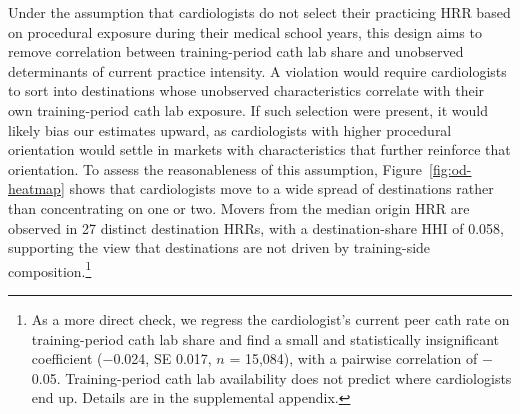 \documentclass[12pt]{article}
\begin{document}
Under the assumption that cardiologists do not select their practicing HRR based on procedural exposure during their medical school years, this design aims to remove correlation between training-period cath lab share and unobserved determinants of current practice intensity. A violation would require cardiologists to sort into destinations whose unobserved characteristics correlate with their own training-period cath lab exposure. If such selection were present, it would likely bias our estimates upward, as cardiologists with higher procedural orientation would settle in markets with characteristics that further reinforce that orientation. To assess the reasonableness of this assumption, Figure~\ref{fig:od-heatmap} shows that cardiologists move to a wide spread of destinations rather than concentrating on one or two. Movers from the median origin HRR are observed in 27 distinct destination HRRs, with a destination-share HHI of 0.058, supporting the view that destinations are not driven by training-side composition.\footnote{As a more direct check, we regress the cardiologist's current peer cath rate on training-period cath lab share and find a small and statistically insignificant coefficient ($-$0.024, SE 0.017, $n$ = 15,084), with a pairwise correlation of $-$0.05. Training-period cath lab availability does not predict where cardiologists end up. Details are in the supplemental appendix.}
\end{document}
